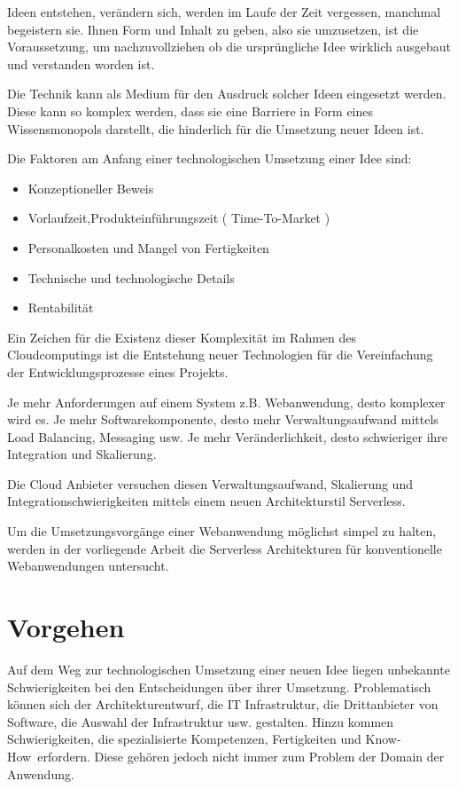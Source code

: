 \documentclass[
12pt,
english,
ngerman,
headsepline,
twoside,
openright,
numbers=noenddot,version=first
]{scrreprt}
\begin{document}
Ideen entstehen, verändern sich, werden im Laufe der Zeit vergessen, manchmal begeistern sie. Ihnen Form und Inhalt zu geben, also sie umzusetzen, ist die Voraussetzung, um nachzuvollziehen ob die ursprüngliche Idee wirklich ausgebaut und verstanden worden ist.

Die Technik kann als Medium für den Ausdruck solcher Ideen eingesetzt werden. Diese kann so komplex werden, dass sie eine Barriere in Form eines Wissensmonopols darstellt, die hinderlich für die Umsetzung neuer Ideen ist.

Die Faktoren am Anfang einer technologischen Umsetzung einer Idee sind:
\begin{itemize}
	\item Konzeptioneller Beweis\label{aspect:proofConcept}
	\item Vorlaufzeit,Produkteinführungszeit ( Time-To-Market ) \label{aspect:timeToMarket}
	\item Personalkosten und Mangel von Fertigkeiten \label{aspect:costHumanResources}
	\item Technische und technologische Details\label{aspect:techDetails}
	\item Rentabilität\label{aspect:profit}
\end{itemize}

Ein Zeichen für die Existenz dieser Komplexität im Rahmen des Cloudcomputings ist die Entstehung neuer Technologien für die Vereinfachung der Entwicklungsprozesse eines Projekts. 

Je mehr Anforderungen auf einem System z.B. Webanwendung, desto komplexer wird es. Je mehr Softwarekomponente, desto mehr Verwaltungsaufwand mittels Load Balancing, Messaging usw. Je mehr Veränderlichkeit, desto schwieriger ihre Integration und Skalierung.\cite{patternIntegrationEnterprise} 


Die Cloud Anbieter versuchen diesen Verwaltungsaufwand, Skalierung und Integrationschwierigkeiten mittels einem neuen Architekturstil Serverless.

Um die Umsetzungsvorgänge einer Webanwendung möglichst simpel zu halten, werden in der vorliegende Arbeit die Serverless Architekturen für konventionelle Webanwendungen untersucht.


\section{Vorgehen}
Auf dem Weg zur technologischen Umsetzung einer neuen Idee liegen unbekannte Schwierigkeiten
bei den Entscheidungen über ihrer Umsetzung. Problematisch können sich der Architekturentwurf, die IT Infrastruktur, die Drittanbieter von Software, die Auswahl der Infrastruktur usw. gestalten. Hinzu kommen Schwierigkeiten, die spezialisierte Kompetenzen, Fertigkeiten und \glqq Know-How\grqq\ erfordern. Diese gehören jedoch nicht immer zum Problem der Domain der Anwendung.
\end{document}
